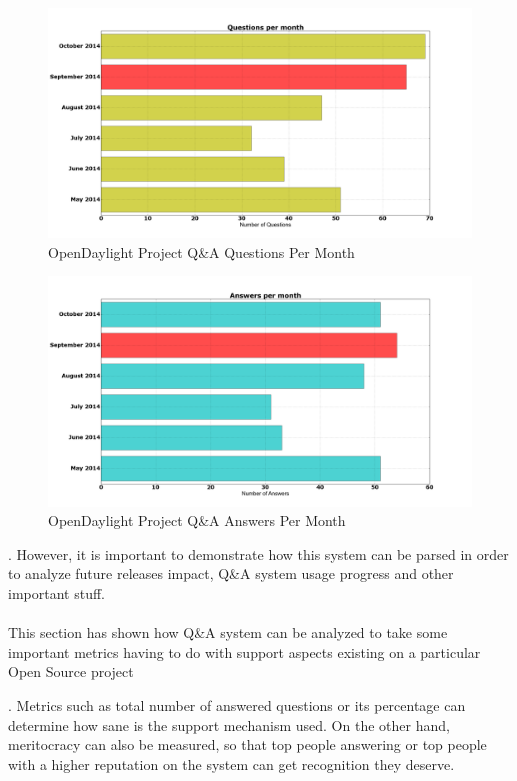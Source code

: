 \documentclass[a4paper, 12pt]{book}
\begin{document}
{\begin{center}
 \begin{figure}[H]
 \begin{center}
   \includegraphics[width=17cm]{img/questions_month_01.png}
   \caption{OpenDaylight Project Q\&A Questions Per Month}
   \label{fig:odl_qa_questions_month}
 \end{center}
 \end{figure}
\end{center}
\begin{center}
 \begin{figure}[H]
 \begin{center}
   \includegraphics[width=17cm]{img/answers_month_01.png}
   \caption{OpenDaylight Project Q\&A Answers Per Month}
   \label{fig:odl_qa_answers_month}
 \end{center}
 \end{figure}
\end{center}

. However, it is important to demonstrate how this system can be parsed in order to analyze future releases impact, Q\&A system usage progress and other important stuff.\\
\\
This section has shown how Q\&A system can be analyzed to take some important metrics having to do with support aspects existing on a particular Open Source project}. Metrics such as total number of answered questions or its percentage can determine how sane is the support mechanism used. On the other hand, meritocracy can also be measured, so that top people answering or top people with a higher reputation on the system can get recognition they deserve.
\end{document}
